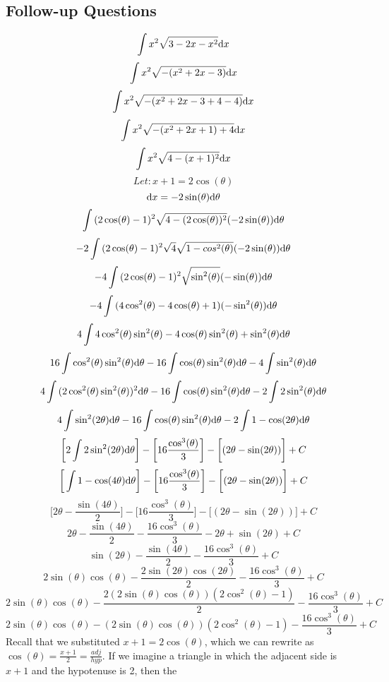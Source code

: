 \documentclass{math}
\begin{document}
\subsection*{Follow-up Questions}
\[ \int{x^{2}\sqrt{3-2x-x^{2}}\mathrm{d}{x}} \]
\[ \int{x^{2}\sqrt{-(x^{2}+2x-3)}\mathrm{d}{x}} \]
\[ \int{x^{2}\sqrt{-(x^{2}+2x-3+4-4)}\mathrm{d}{x}} \]
\[ \int{x^{2}\sqrt{-(x^{2}+2x+1)+4}\mathrm{d}{x}} \]
\[ \int{x^{2}\sqrt{4-(x+1)^{2}}\mathrm{d}{x}} \]
\[ Let: x + 1 = 2\cos(\theta) \]
\[ \mathrm{d}{x} = -2\sin(\theta)\mathrm{d}{\theta} \]
\[ \int{(2\cos(\theta)-1)^{2}\sqrt{4-(2\cos(\theta))^{2}}
   (-2\sin(\theta))\mathrm{d}{\theta}} \]
\[ -2\int{(2\cos(\theta)-1)^{2}\sqrt{4}\sqrt{1-cos^{2}(\theta)}
   (-2\sin(\theta))\mathrm{d}{\theta}} \]
\[ -4\int{(2\cos(\theta)-1)^{2}\sqrt{\sin^{2}(\theta)}
   (-\sin(\theta))\mathrm{d}{\theta}} \]
\[ -4\int{(4\cos^{2}(\theta)-4\cos(\theta)+1)
   (-\sin^{2}(\theta))\mathrm{d}{\theta}} \]
\[ 4\int{4\cos^{2}(\theta)\sin^{2}(\theta)-4\cos(\theta)\sin^{2}(\theta)+
   \sin^{2}(\theta)\mathrm{d}{\theta}} \]
\[ 16\int{\cos^{2}(\theta)\sin^{2}(\theta)\mathrm{d}{\theta}}-
   16\int{\cos(\theta)\sin^{2}(\theta)\mathrm{d}{\theta}}-
   4\int{\sin^{2}(\theta)\mathrm{d}{\theta}} \]
\[ 4\int{(2\cos^{2}(\theta)\sin^{2}(\theta))^{2}\mathrm{d}{\theta}}-
   16\int{\cos(\theta)\sin^{2}(\theta)\mathrm{d}{\theta}}-
   2\int{2\sin^{2}(\theta)\mathrm{d}{\theta}} \]
\[ 4\int{\sin^{2}(2\theta)\mathrm{d}{\theta}}-
   16\int{\cos(\theta)\sin^{2}(\theta)\mathrm{d}{\theta}}-
   2\int{1-\cos(2\theta)\mathrm{d}{\theta}} \]
\[ \bigg[2\int{2\sin^{2}(2\theta)\mathrm{d}{\theta}}\bigg]-
   \bigg[16\frac{\cos^{3}(\theta)}{3}\bigg]-
   \bigg[(2\theta-\sin(2\theta))\bigg]+C \]
\[ \bigg[\int{1-\cos(4\theta)\mathrm{d}{\theta}}\bigg]-
   \bigg[16\frac{\cos^{3}(\theta)}{3}\bigg]-
   \bigg[(2\theta-\sin(2\theta))\bigg]+C \]
\[ \bigg[2\theta-\frac{\sin(4\theta)}{2}\bigg]-
   \bigg[16\frac{\cos^{3}(\theta)}{3}\bigg]-
   \bigg[(2\theta-\sin(2\theta))\bigg]+C \]
\[ 2\theta-\frac{\sin(4\theta)}{2}-
   \frac{16\cos^{3}(\theta)}{3}-
   2\theta+\sin(2\theta)+C \]
\[ \sin(2\theta)-\frac{\sin(4\theta)}{2}-\frac{16\cos^{3}(\theta)}{3}+C \]
\[ 2\sin(\theta)\cos(\theta)-
   \frac{2\sin(2\theta)\cos(2\theta)}{2}-
   \frac{16\cos^{3}(\theta)}{3}+C \]
\[ 2\sin(\theta)\cos(\theta)-
   \frac{2(2\sin(\theta)\cos(\theta))(2\cos^{2}(\theta)-1)}{2}-
   \frac{16\cos^{3}(\theta)}{3}+C \]
\[ 2\sin(\theta)\cos(\theta)-
   (2\sin(\theta)\cos(\theta))(2\cos^{2}(\theta)-1)-
   \frac{16\cos^{3}(\theta)}{3}+C \]
Recall that we substituted \( x+1 = 2\cos(\theta) \), which we can rewrite as
\(\cos(\theta) = \frac{x+1}{2} = \frac{adj}{hyp} \). If we imagine a triangle
in which the adjacent side is \( x+1 \) and the hypotenuse is 2, then the
\end{document}
